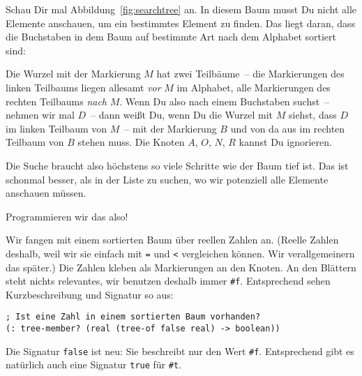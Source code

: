 Schau Dir mal Abbildung~\ref{fig:searchtree} an.  In diesem Baum musst
Du nicht alle Elemente anschauen, um ein bestimmtes Element zu
finden.  Das liegt daran, dass die Buchstaben in dem Baum auf
bestimmte Art nach dem Alphabet sortiert sind:

Die Wurzel mit der Markierung $M$ hat zwei Teilbäume~-- die
Markierungen des linken Teilbaums liegen allesamt \emph{vor} $M$ im
Alphabet, alle Markierungen des rechten Teilbaums \emph{nach} $M$.
Wenn Du also nach einem Buchstaben suchst~-- nehmen wir mal $D$~--
dann weißt Du, wenn Du die Wurzel mit $M$ siehst, dass $D$ im linken
Teilbaum von $M$~-- mit der Markierung $B$ und von da aus im rechten
Teilbaum von $B$ stehen muss.  Die Knoten $A$, $O$, $N$, $R$ kannst Du
ignorieren.

Die Suche braucht also höchstens so viele Schritte wie der Baum tief
ist.  Das ist schonmal besser, als in der Liste zu suchen, wo wir
potenziell alle Elemente anschauen müssen.

Programmieren wir das also!

Wir fangen mit einem sortierten Baum über reellen Zahlen an.
(Reelle Zahlen deshalb, weil wir sie einfach mit \lstinline{=} und
\lstinline{<} vergleichen können.  Wir verallgemeinern das später.)
Die Zahlen kleben als Markierungen an den Knoten.  An den Blättern
steht nichts relevantes, wir benutzen deshalb immer \lstinline{#f}.
Entsprechend sehen Kurzbeschreibung und Signatur so aus:
%
\begin{lstlisting}
; Ist eine Zahl in einem sortierten Baum vorhanden? 
(: tree-member? (real (tree-of false real) -> boolean))
\end{lstlisting}
%
Die Signatur \lstinline{false} ist neu:
Sie beschreibt nur den Wert \lstinline{#f}.  Entsprechend gibt es
natürlich auch eine Signatur
\lstinline{true} für \lstinline{#t}.

